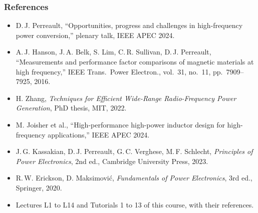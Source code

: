 \begin{frame}
	\frametitle{References}
	\scriptsize
	\begin{itemize}
		\item D.\,J. Perreault, ``Opportunities, progress and challenges in high-frequency power conversion,'' plenary talk, IEEE APEC 2024.
		\item A.\,J. Hanson, J.\,A. Belk, S. Lim, C.\,R. Sullivan, D.\,J. Perreault, ``Measurements and performance factor comparisons of magnetic materials at high frequency,'' IEEE Trans.\ Power Electron., vol.\ 31, no.\ 11, pp.\ 7909--7925, 2016.
		\item H. Zhang, \textit{Techniques for Efficient Wide-Range Radio-Frequency Power Generation}, PhD thesis, MIT, 2022.
		\item M. Joisher et al., ``High-performance high-power inductor design for high-frequency applications,'' IEEE APEC 2024.
		\item J.\,G. Kassakian, D.\,J. Perreault, G.\,C. Verghese, M.\,F. Schlecht, \textit{Principles of Power Electronics}, 2nd ed., Cambridge University Press, 2023.
		\item R.\,W. Erickson, D. Maksimovi\'c, \textit{Fundamentals of Power Electronics}, 3rd ed., Springer, 2020.
		\item Lectures L1 to L14 and Tutorials 1 to 13 of this course, with their references.
	\end{itemize}
\end{frame}
